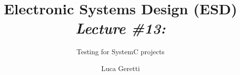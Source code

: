 \documentclass{beamer}
\title[ESD \#13]{Electronic Systems Design (ESD) \\ {\em \small Lecture \#13:}}
\subtitle{Testing for SystemC projects}
\author{Luca Geretti}
\date{}
\institute{\uppercase{Università degli Studi di Udine}\\\url{luca.geretti@uniud.it}\\\url{https://bitbucket.org/uniud_esd/course}}
\begin{document}
\begin{frame}[plain,t]
\titlepage
\end{frame}

\end{document}
